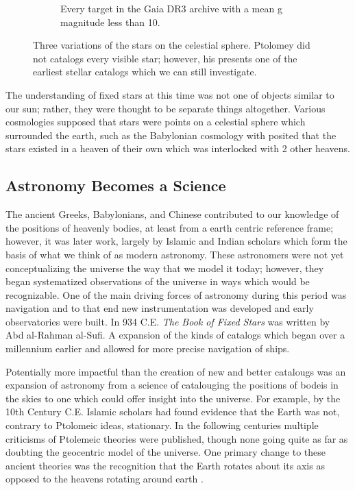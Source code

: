 \begin{figure}[htbp]
\begin{subfigure}[t]{0.3\textwidth}
      \caption{Every target in the Gaia DR3 archive with a mean g magnitude less than 10. }
      \label{fig:starsL10}
  \end{subfigure}
  \caption{Three variations of the stars on the celestial sphere. Ptolomey did
  not catalogs every visible star; however, his presents one of the earliest
  stellar catalogs which we can still investigate.}
  \label{fig:starsInHistory}
\end{figure}

The understanding of fixed stars at this time was not one of objects similar to
our sun; rather, they were thought to be separate things altogether. Various
cosmologies supposed that stars were points on a celestial sphere which
surrounded the earth, such as the Babylonian cosmology with posited that the
stars existed in a heaven of their own which was interlocked with 2 other
heavens.

\subsection{Astronomy Becomes a Science}
The ancient Greeks, Babylonians, and Chinese contributed to our knowledge of
the positions of heavenly bodies, at least from a earth centric reference
frame; however, it was later work, largely by Islamic and Indian scholars which
form the basis of what we think of as modern astronomy. These astronomers were
not yet conceptualizing the universe the way that we model it today; however,
they began systematized observations of the universe in ways which would be
recognizable. One of the main driving forces of astronomy during this period
was navigation and to that end new instrumentation was developed and early
observatories were built. In 934 C.E. \textit{The Book of Fixed Stars} was
written by Abd al-Rahman al-Sufi. A expansion of the kinds of catalogs which
began over a millennium earlier and allowed for more precise navigation of
ships. 

Potentially more impactful than the creation of new and better catalougs was an
expansion of astronomy from a science of catalouging the positions of bodeis in
the skies to one which could offer insight into the universe. For example, by the 10th
Century C.E. Islamic scholars had found evidence that the Earth was not,
contrary to Ptolomeic ideas, stationary. In the following centuries multiple
criticisms of Ptolemeic theories were published, though none going quite as far
as doubting the geocentric model of the universe. One primary change to these
ancient theories was the recognition that the Earth rotates about its axis as
opposed to the heavens rotating around earth \addcite. 

